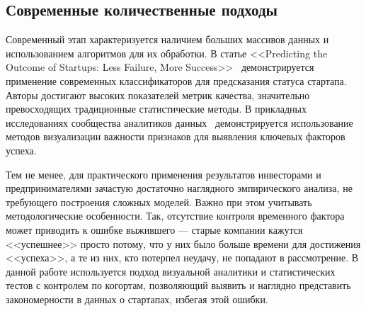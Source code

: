 \subsection{Современные количественные подходы}

Современный этап характеризуется наличием больших массивов данных и использованием алгоритмов для их обработки. В статье <<Predicting the Outcome of Startups: Less Failure, More Success>>~\cite{new-study} демонстрируется применение современных классификаторов для предсказания статуса стартапа. Авторы достигают высоких показателей метрик качества, значительно превосходящих традиционные статистические методы. В прикладных исследованиях сообщества аналитиков данных~\cite{kagglexai} демонстрируется использование методов визуализации важности признаков для выявления ключевых факторов успеха.

Тем не менее, для практического применения результатов инвесторами и предпринимателями зачастую достаточно наглядного эмпирического анализа, не требующего построения сложных моделей. Важно при этом учитывать методологические особенности. Так, отсутствие контроля временного фактора может приводить к ошибке выжившего --- старые компании кажутся <<успешнее>> просто потому, что у них было больше времени для достижения <<успеха>>, а те из них, кто потерпел неудачу, не попадают в рассмотрение. В данной работе используется подход визуальной аналитики и статистических тестов с контролем по когортам, позволяющий выявить и наглядно представить закономерности в данных о стартапах, избегая этой ошибки.
